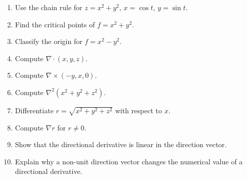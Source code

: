 \begin{enumerate}
  \item Use the chain rule for $z=x^2+y^2$, $x=\cos t$, $y=\sin t$.
  \item Find the critical points of $f=x^2+y^2$.
  \item Classify the origin for $f=x^2-y^2$.
  \item Compute $\nabla\cdot(x,y,z)$.
  \item Compute $\nabla\times(-y,x,0)$.
  \item Compute $\nabla^2(x^2+y^2+z^2)$.
  \item Differentiate $r=\sqrt{x^2+y^2+z^2}$ with respect to $x$.
  \item Compute $\nabla r$ for $r\ne0$.
  \item Show that the directional derivative is linear in the direction vector.
  \item Explain why a non-unit direction vector changes the numerical value of a directional derivative.
\end{enumerate}
